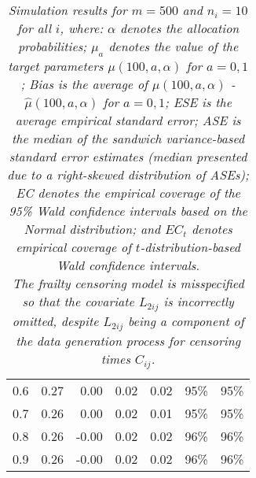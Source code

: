 \documentclass[12pt, letterpaper]{article}
\begin{document}
\begin{table}[ht!]
\begin{tabular}{rrrrrll}
  0.6 & 0.27 & 0.00 & 0.02 & 0.02 & 95\% & 95\% \\ 
  0.7 & 0.26 & 0.00 & 0.02 & 0.01 & 95\% & 95\% \\ 
  0.8 & 0.26 & -0.00 & 0.02 & 0.02 & 96\% & 96\% \\ 
  0.9 & 0.26 & -0.00 & 0.02 & 0.02 & 96\% & 96\% \\ 
   \hline
\end{tabular}
\egroup
\caption*{\textit{Simulation results for $m = 500$ and $n_i = 10$ for all $i$, where: $\alpha$ denotes the allocation probabilities; $\mu_a$ denotes the value of the target parameters $\mu(100, a, \alpha)$ for $a=0,1$; Bias is the average of $\mu(100, a, \alpha)$ - $\hat{\mu}(100, a, \alpha)$ for $a=0, 1$; ESE is the average empirical standard error; ASE is the median of the sandwich variance-based standard error estimates (median presented due to a right-skewed distribution of ASEs); EC denotes the empirical coverage of the 95\% Wald confidence intervals based on the Normal distribution; and $EC_t$ denotes empirical coverage of $t$-distribution-based Wald confidence intervals.} \\ 

\textit{The frailty censoring model is misspecified so that the covariate $L_{2ij}$ is incorrectly omitted, despite $L_{2ij}$ being a component of the data generation process for censoring times $C_{ij}$.}}
\end{table}

\clearpage 


\end{document}
